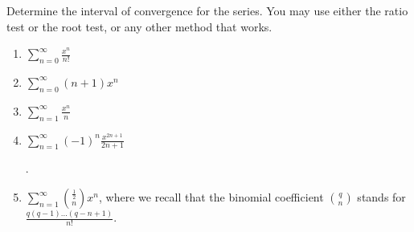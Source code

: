 Determine the interval of convergence for the series. You may use either the ratio test or the root test, or any other method that works.

\begin{multicols}{2}
\begin{enumerate}
\item 
$\displaystyle \sum\limits_{n=0}^{\infty} \frac{x^n}{n!}$

\item 
$\displaystyle \sum\limits_{n=0}^{\infty} (n+1)x^n $

\item 
$\displaystyle \sum\limits_{n=1}^{\infty} \frac{x^n}{n}$
\answer{converges for $|x|\in[-1,1)$.}
\item 
$\displaystyle\sum\limits_{n=1}^{\infty} (-1)^n\frac{x^{2n+1}}{2n+1}$

\answer{converges for $|x|\in (-1, 1]$}.
\item 
$\displaystyle \sum\limits_{n=1}^{\infty} \binom{\frac{1}{2}}{n}x^{n}$, where we recall that the binomial coefficient $\displaystyle \binom{q}{n}$ stands for $\displaystyle\frac{q (q-1)\dots (q-n+1)}{n!}$.

\answer{converges for $x\in (-1,1]$. } 
\end{enumerate}
\end{multicols}